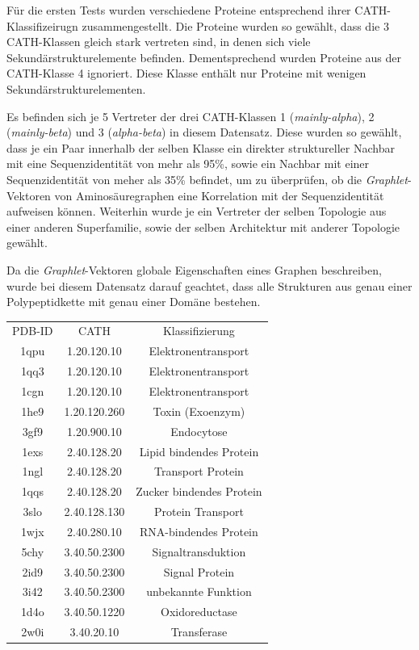 \documentclass{report}
\begin{document}
F\"ur die ersten Tests wurden verschiedene Proteine entsprechend ihrer CATH-Klassifizeirugn zusammengestellt. Die Proteine wurden so gew\"ahlt, dass die 3 CATH-Klassen gleich stark vertreten sind, in denen sich viele Sekund\"arstrukturelemente befinden. Dementsprechend wurden Proteine aus der CATH-Klasse 4 ignoriert. Diese Klasse enth\"alt nur Proteine mit wenigen Sekund\"arstrukturelementen.

Es befinden sich je 5 Vertreter der drei CATH-Klassen 1 (\textit{mainly-alpha}), 2 (\textit{mainly-beta}) und 3 (\textit{alpha-beta}) in diesem Datensatz. Diese wurden so gew\"ahlt, dass je ein Paar innerhalb der selben Klasse ein direkter struktureller Nachbar mit eine Sequenzidentit\"at von mehr als 95\%, sowie ein Nachbar mit einer Sequenzidentit\"at von meher als 35\% befindet, um zu \"uberpr\"ufen, ob die \textit{Graphlet}-Vektoren von Aminos\"auregraphen eine Korrelation mit der Sequenzidentit\"at aufweisen k\"onnen.
Weiterhin wurde je ein Vertreter der selben Topologie aus einer anderen Superfamilie, sowie der selben Architektur mit anderer Topologie gew\"ahlt.
 
Da die \textit{Graphlet}-Vektoren globale Eigenschaften eines Graphen beschreiben, wurde bei diesem Datensatz darauf geachtet, dass alle Strukturen aus genau einer Polypeptidkette mit genau einer Dom\"ane bestehen.


\begin{tabular}{c c c}

PDB-ID & CATH        & Klassifizierung         \\
1qpu   & 1.20.120.10 & Elektronentransport     \\
1qq3   & 1.20.120.10 & Elektronentransport     \\
1cgn   & 1.20.120.10 & Elektronentransport     \\
1he9   & 1.20.120.260& Toxin (Exoenzym)        \\
3gf9   & 1.20.900.10 & Endocytose              \\
1exs   & 2.40.128.20 & Lipid bindendes Protein \\
1ngl   & 2.40.128.20 & Transport Protein       \\
1qqs   & 2.40.128.20 & Zucker bindendes Protein\\
3slo   & 2.40.128.130& Protein Transport       \\
1wjx   & 2.40.280.10 & RNA-bindendes Protein   \\
5chy   & 3.40.50.2300& Signaltransduktion      \\
2id9   & 3.40.50.2300& Signal Protein          \\
3i42   & 3.40.50.2300& unbekannte Funktion     \\
1d4o   & 3.40.50.1220& Oxidoreductase          \\
2w0i   & 3.40.20.10  & Transferase             \\

\end{tabular}
\end{document}
